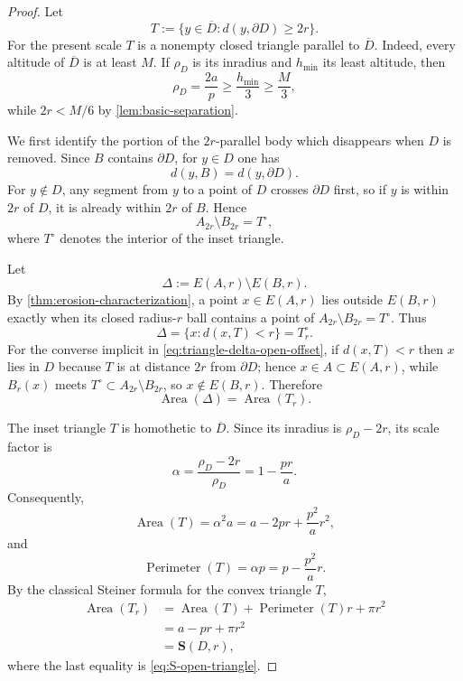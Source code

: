 \documentclass[11pt]{article}
\newcommand{\Area}{\operatorname{Area}}
\newcommand{\Steiner}{\mathbf S}
\numberwithin{equation}{section}
\begin{document}
\begin{proof}
Let
\[
T:=\{y\in\overline D:d(y,\partial D)\ge2r\}.
\]
For the present scale $T$ is a nonempty closed triangle parallel to $\overline D$. Indeed, every altitude of $\overline D$ is at least $M$. If $\rho_D$ is its inradius and $h_{\min}$ its least altitude, then
\[
\rho_D=\frac{2a}{p}\ge\frac{h_{\min}}3\ge\frac M3,
\]
while $2r<M/6$ by \cref{lem:basic-separation}.

We first identify the portion of the $2r$-parallel body which disappears when $D$ is removed. Since $B$ contains $\partial D$, for $y\in D$ one has
\[
d(y,B)=d(y,\partial D).
\]
For $y\notin D$, any segment from $y$ to a point of $D$ crosses $\partial D$ first, so if $y$ is within $2r$ of $D$, it is already within $2r$ of $B$. Hence
\begin{equation}\label{eq:A2r-minus-B2r-triangle}
A_{2r}\setminus B_{2r}=T^\circ,
\end{equation}
where $T^\circ$ denotes the interior of the inset triangle.

Let
\[
\Delta:=E(A,r)\setminus E(B,r).
\]
By \cref{thm:erosion-characterization}, a point $x\in E(A,r)$ lies outside $E(B,r)$ exactly when its closed radius-$r$ ball contains a point of $A_{2r}\setminus B_{2r}=T^\circ$. Thus
\begin{equation}\label{eq:triangle-delta-open-offset}
\Delta=\{x:d(x,T)<r\}=T_r^\circ.
\end{equation}
For the converse implicit in \eqref{eq:triangle-delta-open-offset}, if $d(x,T)<r$ then $x$ lies in $D$ because $T$ is at distance $2r$ from $\partial D$; hence $x\in A\subset E(A,r)$, while $B_r(x)$ meets $T^\circ\subset A_{2r}\setminus B_{2r}$, so $x\notin E(B,r)$. Therefore
\[
\Area(\Delta)=\Area(T_r).
\]

The inset triangle $T$ is homothetic to $\overline D$. Since its inradius is $\rho_D-2r$, its scale factor is
\[
\alpha
=\frac{\rho_D-2r}{\rho_D}
=1-\frac{pr}{a}.
\]
Consequently,
\[
\Area(T)=\alpha^2a
=a-2pr+\frac{p^2}{a}r^2,
\]
and
\[
\operatorname{Perimeter}(T)=\alpha p
=p-\frac{p^2}{a}r.
\]
By the classical Steiner formula for the convex triangle $T$,
\[
\begin{aligned}
\Area(T_r)
&=\Area(T)+\operatorname{Perimeter}(T)r+\pi r^2\\
&=a-pr+\pi r^2\\
&=\Steiner(D,r),
\end{aligned}
\]
where the last equality is \eqref{eq:S-open-triangle}.
\end{proof}
\end{document}

